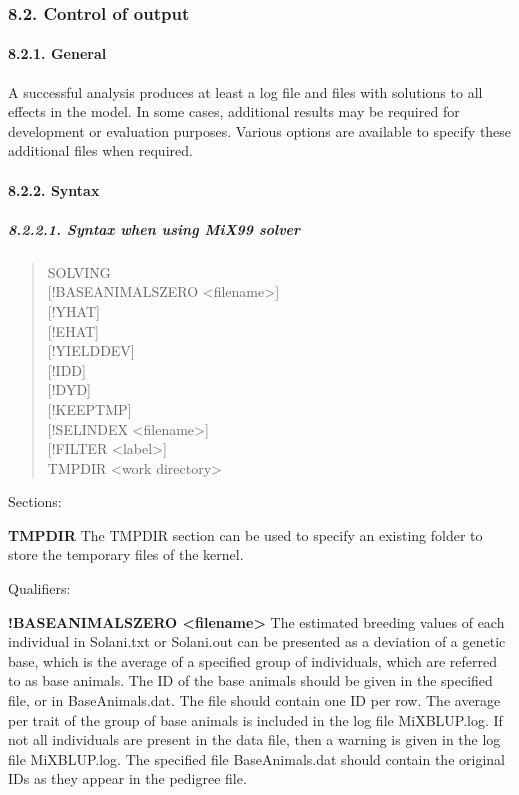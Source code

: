 \subsubsection{8.2. Control of output}\label{Cont07}

\paragraph{8.2.1. General}\label{Cont08}

A successful analysis produces at least a log file and files with
solutions to all effects in the model. In some cases, additional results
may be required for development or evaluation purposes. Various options
are available to specify these additional files when required.

\paragraph{8.2.2. Syntax}\label{Cont09}

\subparagraph{8.2.2.1. Syntax when using MiX99 solver}\label{Cont10}

\begin{quote}
SOLVING\\
{[}!BASEANIMALSZERO \textless filename\textgreater{]}\\
{[}!YHAT{]}\\
{[}!EHAT{]}\\
{[}!YIELDDEV{]}\\
{[}!IDD{]}\\
{[}!DYD{]}\\
{[}!KEEPTMP{]}\\
{[}!SELINDEX \textless filename\textgreater{]}\\
{[}!FILTER \textless label\textgreater{]}\\
TMPDIR \textless work directory\textgreater{}
\end{quote}

Sections:

\textbf{TMPDIR} The TMPDIR section can be used to specify an existing
folder to store the temporary files of the kernel.

Qualifiers:

\textbf{!BASEANIMALSZERO \textless filename\textgreater{}} The estimated
breeding values of each individual in Solani.txt or Solani.out can be
presented as a deviation of a genetic base, which is the average of a
specified group of individuals, which are referred to as base animals.
The ID of the base animals should be given in the specified file, or in
BaseAnimals.dat. The file should contain one ID per row. The average per
trait of the group of base animals is included in the log file
MiXBLUP.log. If not all individuals are present in the data file, then a
warning is given in the log file MiXBLUP.log. The specified file
BaseAnimals.dat should contain the original IDs as they appear in the
pedigree file.

